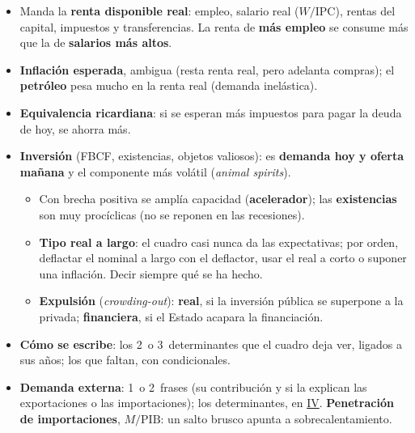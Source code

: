 \documentclass{article}
\begin{document}
\begin{columnas}
\begin{itemize}[itemsep=1.5pt]
\begin{itemize}
  \item Manda la \textbf{renta disponible real}: empleo, salario real ($W/\mathrm{IPC}$), rentas del capital, impuestos y transferencias. La renta de \textbf{más empleo} se consume más que la de \textbf{salarios más altos}.
  \item \textbf{Inflación esperada}, ambigua (resta renta real, pero adelanta compras); el \textbf{petróleo} pesa mucho en la renta real (demanda inelástica).
  \item \textbf{Equivalencia ricardiana}: si se esperan más impuestos para pagar la deuda de hoy, se ahorra más.
  \end{itemize}
\end{itemize}
\begin{itemize}[itemsep=1.5pt]
\item \textbf{Inversión} (FBCF, existencias, objetos valiosos): es \textbf{demanda hoy y oferta mañana} y el componente más volátil (\emph{animal spirits}).
  \begin{itemize}
  \item Con brecha positiva se amplía capacidad (\textbf{acelerador}); las \textbf{existencias} son muy procíclicas (no se reponen en las recesiones).
  \item \textbf{Tipo real a largo}: el cuadro casi nunca da las expectativas; por orden, deflactar el nominal a largo con el deflactor, usar el real a corto o suponer una inflación. Decir siempre qué se ha hecho.
  \item \textbf{Expulsión} (\emph{crowding-out}): \textbf{real}, si la inversión pública se superpone a la privada; \textbf{financiera}, si el Estado acapara la financiación.
  \end{itemize}
\item \textbf{Cómo se escribe}: los 2~o 3~determinantes que el cuadro deja ver, ligados a sus años; los que faltan, con condicionales.
\item \textbf{Demanda externa}: 1~o 2~frases (su contribución y si la explican las exportaciones o las importaciones); los determinantes, en \hyperref[rep:IV]{IV}. \textbf{Penetración de importaciones}, $M/\mathrm{PIB}$: un salto brusco apunta a sobrecalentamiento.
\end{itemize}


\end{columnas}
\end{document}
